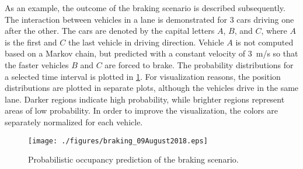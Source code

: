 As an example, the outcome of the braking scenario is described subsequently. The interaction between vehicles in a lane is demonstrated for $3$ cars driving one after the other. The cars are denoted by the capital letters $A$, $B$, and $C$, where $A$ is the first and $C$ the last vehicle in driving direction. Vehicle $A$ is not computed based on a Markov chain, but predicted with a constant velocity of $3$~m/s so that the faster vehicles $B$ and $C$ are forced to brake. The probability distributions for a selected time interval is plotted in \cref{fig:brakingScenario}. For visualization reasons, the position distributions are plotted in separate plots, although the vehicles drive in the same lane. Darker regions indicate high probability, while brighter regions represent areas of low probability. In order to improve the visualization, the colors are separately normalized for each vehicle.

\begin{center}
\begin{figure}[htb]
\centering
	\texttt{[image: ./figures/braking\_09August2018.eps]}
	\caption{Probabilistic occupancy prediction of the braking scenario.}
	\label{fig:brakingScenario}
\end{figure}
\end{center}
